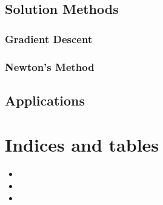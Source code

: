 \documentclass[letterpaper,10pt,english]{sphinxmanual}
\begin{document}
\section{Solution Methods}
\label{\detokenize{operationsResearch/NLP:solution-methods}}

\subsection{Gradient Descent}
\label{\detokenize{operationsResearch/NLP:gradient-descent}}

\subsection{Newton’s Method}
\label{\detokenize{operationsResearch/NLP:newton-s-method}}

\section{Applications}
\label{\detokenize{operationsResearch/NLP:applications}}

\chapter{Indices and tables}
\label{\detokenize{index:indices-and-tables}}\begin{itemize}
\item {} 
\sphinxAtStartPar
{}

\item {} 
\sphinxAtStartPar
{}

\item {} 
\sphinxAtStartPar
{}

\end{itemize}



\renewcommand{\indexname}{Index}
\printindex
\end{document}
